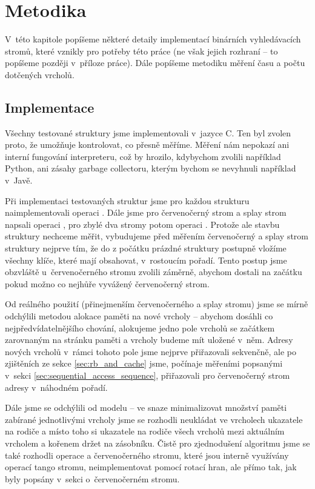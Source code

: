 \chapter{Metodika}

V~této kapitole popíšeme některé detaily implementací binárních vyhledávacích stromů, které vznikly pro potřeby této práce (ne však jejich rozhraní -- to popíšeme později v~příloze práce). Dále popíšeme metodiku měření času a počtu dotčených vrcholů.

\section{Implementace}

Všechny testované struktury jsme implementovali v~jazyce C. Ten byl zvolen
proto, že umožňuje kontrolovat, co přesně měříme. Měření nám nepokazí ani
interní fungování interpreteru, což by hrozilo, kdybychom zvolili například
Python, ani zásahy garbage collectoru, kterým bychom se nevyhnuli například
v~Javě.

Při implementaci testovaných struktur jsme pro každou strukturu
naimplementovali operaci . Dále jsme pro červenočerný strom a splay
strom napsali operaci , pro zbylé dva stromy potom operaci
. Protože ale stavbu struktury nechceme měřit,  vybudujeme před měřením
červenočerný a splay strom struktury nejprve tím, že do z počátku prázdné struktury
postupně vložíme všechny klíče, které mají obsahovat, v~rostoucím pořadí. Tento postup jsme obzvláště u~červenočerného stromu zvolili záměrně, abychom dostali na začátku pokud možno co nejhůře vyvážený červenočerný strom.

Od reálného použití (přinejmenším červenočerného a splay stromu) jsme se mírně
odchýlili metodou alokace paměti na nové vrcholy -- abychom dosáhli co
nejpředvídatelnějšího chování, alokujeme jedno pole vrcholů se začátkem
zarovnaným na stránku paměti a vrcholy budeme mít uložené v~něm. Adresy nových
vrcholů v~rámci tohoto pole jsme nejprve přiřazovali sekvenčně, ale po
zjištěních ze sekce \ref{sec:rb_and_cache} jsme, počínaje měřeními popsanými
v~sekci \ref{sec:sequential_access_sequence}, přiřazovali pro červenočerný strom
adresy v~náhodném pořadí. 

Dále jsme se odchýlili od modelu -- ve snaze minimalizovat množství paměti
zabírané jednotlivými vrcholy jsme se rozhodli neukládat ve vrcholech ukazatele na
rodiče a místo toho si ukazatele na rodiče všech vrcholů mezi aktuálním
vrcholem a kořenem držet na zásobníku. Čistě pro zjednodušení algoritmu jsme se
také rozhodli operace  a  červenočerného stromu, které
jsou interně využívány operací  tango stromu, neimplementovat pomocí
rotací hran, ale přímo tak, jak byly popsány v~sekci o~červenočerném stromu. 

